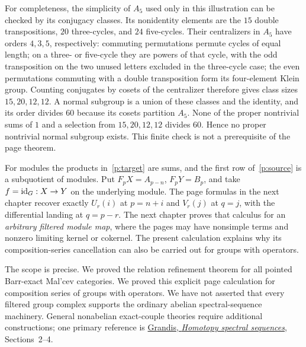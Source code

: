 For completeness, the simplicity of $A_5$ used only in this illustration
can be checked by its conjugacy classes. Its nonidentity elements are
the $15$ double transpositions, $20$ three-cycles, and $24$ five-cycles.
Their centralizers in $A_5$ have orders $4,3,5$, respectively: commuting
permutations permute cycles of equal length; on a three- or five-cycle they
are powers of that cycle, with the odd transposition on the two unused
letters excluded in the three-cycle case; the even permutations commuting
with a double transposition form its four-element Klein group.
Counting conjugates by cosets of the centralizer therefore gives class
sizes $15,20,12,12$. A normal subgroup is a union of these classes and
the identity, and its order divides $60$ because its cosets partition
$A_5$. None of the proper nontrivial sums of $1$ and a selection from
$15,20,12,12$ divides $60$. Hence no proper nontrivial normal subgroup
exists. This finite check is not a prerequisite of the page theorem.

For modules the products in~\eqref{p:target} are sums, and the first
row of~\eqref{p:source} is a subquotient of modules. Put
$F_pX=A_{p-n}$, $F_pY=B_p$, and take $f=\mathrm{id}_G:X\to Y$ on the
underlying module. The page formulas in the next chapter recover exactly
$U_r(i)$ at $p=n+i$ and $V_r(j)$ at $q=j$, with the differential
landing at $q=p-r$. The next chapter proves that calculus for an
\emph{arbitrary filtered module map}, where the pages may have nonsimple
terms and nonzero limiting kernel or cokernel. The present calculation
explains why its composition-series cancellation can also be carried
out for groups with operators.

The scope is precise. We proved the relation refinement theorem for all
pointed Barr-exact Mal'cev categories. We proved this explicit page
calculation for composition series of groups with operators. We have not
asserted that every filtered group complex supports the ordinary abelian
spectral-sequence machinery. General nonabelian exact-couple theories
require additional constructions; one primary reference is
\href{https://arxiv.org/pdf/1007.0632}{Grandis, \emph{Homotopy spectral
sequences}}, Sections~2--4.
